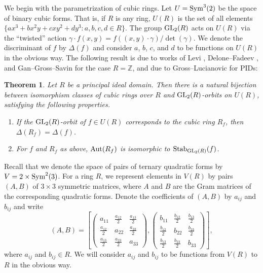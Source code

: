 \documentclass{article}
\def\Z{{\mathbb Z}}
\def\GL{{\rm GL}}
\def\Stab{{\rm Stab}}
\def\Sym{{\rm Sym}}
\def\Aut{{\rm Aut}}
\def\Z{{\mathbb Z}}
\newtheorem{theorem}{Theorem}[section]
\begin{document}
We begin with the parametrization of cubic rings. Let $U=\Sym^3(2)$ be the space of binary cubic forms. That is, if $R$ is any ring, $U(R)$ is the set of all elements $\{ax^3+bx^2y+cxy^2+dy^3:a,b,c,d\in R\}$. The group $\GL_2(R)$ acts on $U(R)$ via the ``twisted'' action $\gamma\cdot f(x,y)=f((x,y)\cdot \gamma)/\det(\gamma)$. We denote the discriminant of $f$ by $\Delta(f)$ and consider $a$, $b$, $c$, and $d$ to be functions on $U(R)$ in the obvious way. The following result is due to works of Levi \cite{Levi}, Delone--Fadeev \cite{DFCF}, and Gan--Gross--Savin \cite{GGSCF} for the case $R=\Z$, and due to Gross--Lucianovic \cite{MR2521487} for PIDs:
\begin{theorem}\label{th:cubic_param}
Let $R$ be a principal ideal domain. Then there is a natural bijection between isomorphism classes of cubic rings over $R$ and $\GL_2(R)$-orbits on $U(R)$, satisfying the following properties.
\begin{enumerate}
\item If the $\GL_2(R)$-orbit of $f\in U(R)$ corresponds to the cubic ring $R_f$, then $\Delta(R_f)=\Delta(f)$.
\item For $f$ and $R_f$ as above, $\Aut(R_f)$ is isomorphic to $\Stab_{\GL_2(R)}(f)$.
\end{enumerate}
\end{theorem}

Recall that we denote the space of pairs of ternary quadratic forms by $V=2\times\Sym^2(3)$. For a ring $R$, we represent elements in $V(R)$ by pairs $(A,B)$ of $3\times 3$ symmetric matrices, where $A$ and $B$ are the Gram matrices of the corresponding quadratic forms. Denote the coefficients of $(A,B)$ by $a_{ij}$ and $b_{ij}$ and write
\begin{equation*}
(A,B)=\left[\left(
\begin{array}{ccc}
a_{11} & \frac{a_{12}}{2} & \frac{a_{13}}{2}\\[.05in]
\frac{a_{12}}{2} & a_{22} & \frac{a_{23}}{2}\\[.05in]
\frac{a_{13}}{2} & \frac{a_{23}}{2} & a_{33}
\end{array}
\right),
\left(
\begin{array}{ccc}
b_{11} & \frac{b_{12}}{2} & \frac{b_{13}}{2}\\[.05in]
\frac{b_{12}}{2} & b_{22} & \frac{b_{23}}{2}\\[.05in]
\frac{b_{13}}{2} & \frac{b_{23}}{2} & b_{33}
\end{array}
\right)
\right],
\end{equation*}
where $a_{ij}$ and $b_{ij}\in R$. We will consider $a_{ij}$ and $b_{ij}$ to be functions from $V(R)$ to $R$ in the obvious way.
\end{document}
